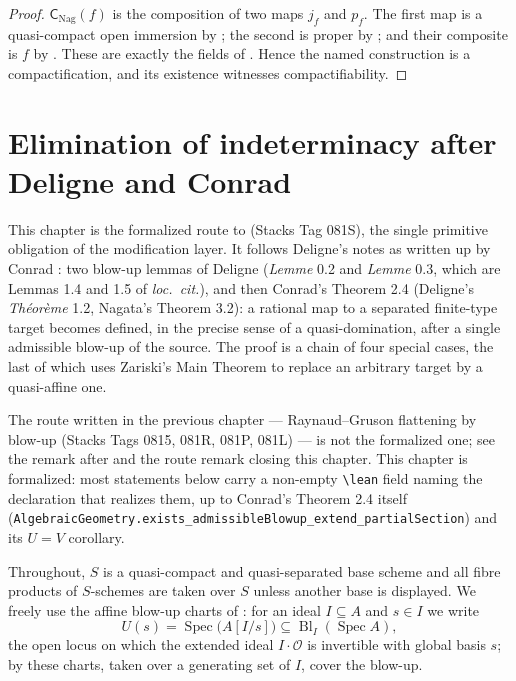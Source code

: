 \begin{proof}
  \leanok
  $\mathsf C_{\mathrm{Nag}}(f)$ is the composition of two maps $j_f$ and $p_f$. The first map is a quasi-compact open immersion by
  ; the second is proper by
  ; and their composite is $f$ by
  .  These are exactly the fields of
  .  Hence the named construction is a
  compactification, and its existence witnesses compactifiability.
\end{proof}

\chapter{Elimination of indeterminacy after Deligne and Conrad}

This chapter is the formalized route to
 (Stacks Tag 081S), the single
primitive obligation of the modification layer.  It follows Deligne's notes as
written up by Conrad
\cite[\S\S1--2, pp.~10--19]{ConradNagata}: two blow-up lemmas of Deligne
(\emph{Lemme} 0.2 and \emph{Lemme} 0.3, which are Lemmas 1.4 and 1.5 of
\emph{loc.\ cit.}), and then Conrad's Theorem 2.4 (Deligne's
\emph{Th\'eor\`eme} 1.2, Nagata's Theorem 3.2): a rational map to a separated
finite-type target becomes defined, in the precise sense of a quasi-domination,
after a single admissible blow-up of the source.  The proof is a chain of four
special cases, the last of which uses Zariski's Main Theorem to replace an
arbitrary target by a quasi-affine one.

The route written in the previous chapter --- Raynaud--Gruson flattening by
blow-up (Stacks Tags 0815, 081R, 081P, 081L) --- is not the formalized one;
see the remark after  and the
route remark closing this chapter.  This chapter is formalized: most statements
below carry a non-empty \verb|\lean| field naming the declaration that realizes
them, up to Conrad's Theorem 2.4 itself
(\verb|AlgebraicGeometry.exists_admissibleBlowup_extend_partialSection|) and its
$U=V$ corollary.

Throughout, $S$ is a quasi-compact and quasi-separated base scheme and all
fibre products of $S$-schemes are taken over $S$ unless another base is
displayed.  We freely use the affine blow-up charts of
: for an ideal $I\subseteq A$ and $s\in I$
we write
\[
  U(s)=\operatorname{Spec}\bigl(A[I/s]\bigr)
    \subseteq\operatorname{Bl}_I(\operatorname{Spec}A),
\]
the open locus on which the extended ideal $I\cdot\mathcal O$ is invertible
with global basis $s$; by
 these charts, taken over a
generating set of $I$, cover the blow-up.


